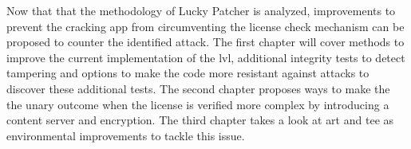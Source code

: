 Now that that the methodology of Lucky Patcher is analyzed, improvements to prevent the cracking app from circumventing the license check mechanism can be proposed to counter the identified attack.
The first chapter will cover methods to improve the current implementation of the \gls{lvl}, additional integrity tests to detect tampering and options to make the code more resistant against attacks to discover these additional tests.
The second chapter proposes ways to make the the unary outcome when the license is verified more complex by introducing a content server and encryption.
The third chapter takes a look at \gls{art} and \gls{tee} as environmental improvements to tackle this issue.
